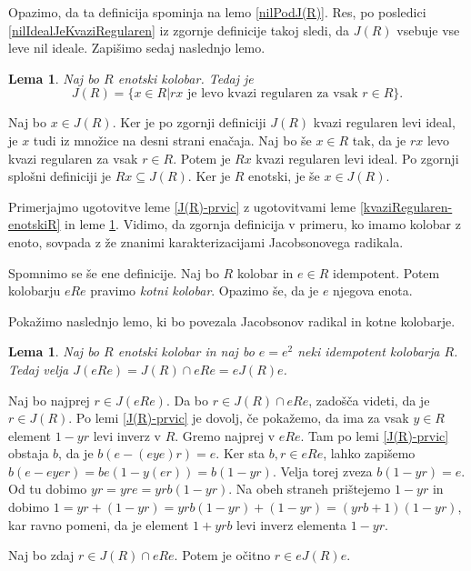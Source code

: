 \documentclass[a4paper, 12pt]{amsart}
\theoremstyle{definition} %
\theoremstyle{plain} %
\newtheorem{lema}[definicija]{Lema}
\begin{document}
Opazimo, da ta definicija spominja na lemo \ref{nilPodJ(R)}. Res, po posledici \ref{nilIdealJeKvaziRegularen} iz zgornje definicije takoj sledi, da $J(R)$ vsebuje vse leve nil ideale. Zapišimo sedaj naslednjo lemo.

\begin{lema}
\label{J(R)-splosen-elementi}
Naj bo $R$ enotski kolobar. Tedaj je 
$$
J(R) = \{ x\in R | rx \text{ je levo kvazi regularen za vsak } r \in R\}.
$$
\end{lema}

\proof
Naj bo $x\in J(R)$. Ker je po zgornji definiciji $J(R)$ kvazi regularen levi ideal, je $x$ tudi iz množice na desni strani enačaja. Naj bo še $x\in R$ tak, da je $rx$ levo kvazi regularen za vsak $r\in R$. Potem je $Rx$ kvazi regularen levi ideal. Po zgornji splošni definiciji je $Rx \subseteq J(R)$. Ker je $R$ enotski, je še $x\in J(R)$. 
\endproof

Primerjajmo ugotovitve leme \ref{J(R)-prvic} z ugotovitvami leme \ref{kvaziRegularen-enotskiR} in leme \ref{J(R)-splosen-elementi}. Vidimo, da zgornja definicija v primeru, ko imamo kolobar z enoto, sovpada z že znanimi karakterizacijami Jacobsonovega radikala.

Spomnimo se še ene definicije. Naj bo $R$ kolobar in $e\in R$ idempotent. Potem kolobarju $eRe$ pravimo \emph{kotni kolobar}. Opazimo še, da je $e$ njegova enota.

Pokažimo naslednjo lemo, ki bo povezala Jacobsonov radikal in kotne kolobarje.

\begin{lema}
\label{J(R)-kotniKolobar}
Naj bo $R$ enotski kolobar in naj bo $e=e^2$ neki idempotent kolobarja $R$. Tedaj velja $J(eRe) = J(R) \cap eRe = eJ(R)e$.
\end{lema}

\proof
Naj bo najprej $r\in J(eRe)$. Da bo $r\in J(R) \cap eRe$, zadošča videti, da je $r\in J(R)$. Po lemi \ref{J(R)-prvic} je dovolj, če pokažemo, da ima za vsak $y\in R$ element $1-yr$ levi inverz v $R$. Gremo najprej v $eRe$. Tam po lemi \ref{J(R)-prvic} obstaja $b$, da je $b(e-(eye) r) = e$. Ker sta $b,r\in eRe$, lahko zapišemo $b(e-eyer) = be(1-y(er)) = b(1-yr)$. Velja torej zveza $b(1-yr) = e$. Od tu dobimo $yr=yre = yrb(1-yr)$. Na obeh straneh prištejemo $1-yr$ in dobimo $1 = yr + (1-yr) = yrb(1-yr) + (1-yr) = (yrb+1)(1-yr)$, kar ravno pomeni, da je element $1+yrb$ levi inverz elementa $1-yr$.

Naj bo zdaj $r\in J(R) \cap eRe$. Potem je očitno $r\in eJ(R)e$.
\end{document}
